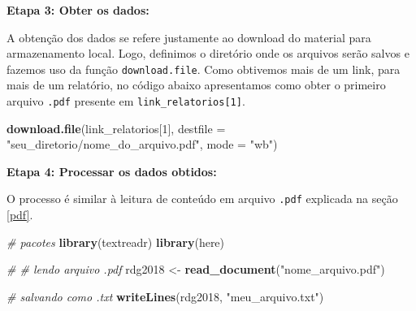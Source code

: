 \documentclass[]{book}
\newenvironment{Shaded}{\begin{snugshade}}{\end{snugshade}}
\newcommand{\CommentTok}[1]{\textcolor[rgb]{0.56,0.35,0.01}{\textit{#1}}}
\newcommand{\DataTypeTok}[1]{\textcolor[rgb]{0.13,0.29,0.53}{#1}}
\newcommand{\DecValTok}[1]{\textcolor[rgb]{0.00,0.00,0.81}{#1}}
\newcommand{\KeywordTok}[1]{\textcolor[rgb]{0.13,0.29,0.53}{\textbf{#1}}}
\newcommand{\NormalTok}[1]{#1}
\newcommand{\OperatorTok}[1]{\textcolor[rgb]{0.81,0.36,0.00}{\textbf{#1}}}
\newcommand{\StringTok}[1]{\textcolor[rgb]{0.31,0.60,0.02}{#1}}
\begin{document}
\begin{Shaded}
\end{Shaded}

\textbf{Etapa 3: Obter os dados:}

A obtenção dos dados se refere justamente ao download do material para armazenamento
local. Logo, definimos o diretório onde os arquivos serão salvos e fazemos uso da
função \texttt{download.file}. Como obtivemos mais de um link, para mais de um relatório,
no código abaixo apresentamos como obter o primeiro arquivo \texttt{.pdf} presente em \texttt{link\_relatorios{[}1{]}}.

\begin{Shaded}
\begin{Highlighting}[]
\KeywordTok{download.file}\NormalTok{(link_relatorios[}\DecValTok{1}\NormalTok{], }\DataTypeTok{destfile =} \StringTok{"seu_diretorio/nome_do_arquivo.pdf"}\NormalTok{, }\DataTypeTok{mode =} \StringTok{"wb"}\NormalTok{)}
\end{Highlighting}
\end{Shaded}

\textbf{Etapa 4: Processar os dados obtidos:}

O processo é similar à leitura de conteúdo em arquivo \texttt{.pdf} explicada na seção \ref{pdf}.

\begin{Shaded}
\begin{Highlighting}[]
\CommentTok{# pacotes}
\KeywordTok{library}\NormalTok{(textreadr)}
\KeywordTok{library}\NormalTok{(here)}

\CommentTok{# # lendo arquivo .pdf}
\NormalTok{rdg2018 <-}\StringTok{ }\KeywordTok{read_document}\NormalTok{(}\StringTok{"nome_arquivo.pdf"}\NormalTok{)}

\CommentTok{# salvando como .txt}
\KeywordTok{writeLines}\NormalTok{(rdg2018, }\StringTok{"meu_arquivo.txt"}\NormalTok{)}
\end{Highlighting}
\end{Shaded}
\end{document}
